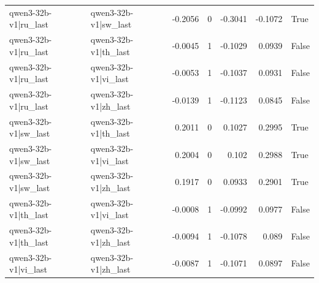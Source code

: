 \begin{table}
\begin{tabular}{l l r r r r l}
qwen3-32b-v1|ru_last & qwen3-32b-v1|sw_last & -0.2056 & 0 & -0.3041 & -0.1072 & True \\
qwen3-32b-v1|ru_last & qwen3-32b-v1|th_last & -0.0045 & 1 & -0.1029 & 0.0939 & False \\
qwen3-32b-v1|ru_last & qwen3-32b-v1|vi_last & -0.0053 & 1 & -0.1037 & 0.0931 & False \\
qwen3-32b-v1|ru_last & qwen3-32b-v1|zh_last & -0.0139 & 1 & -0.1123 & 0.0845 & False \\
qwen3-32b-v1|sw_last & qwen3-32b-v1|th_last & 0.2011 & 0 & 0.1027 & 0.2995 & True \\
qwen3-32b-v1|sw_last & qwen3-32b-v1|vi_last & 0.2004 & 0 & 0.102 & 0.2988 & True \\
qwen3-32b-v1|sw_last & qwen3-32b-v1|zh_last & 0.1917 & 0 & 0.0933 & 0.2901 & True \\
qwen3-32b-v1|th_last & qwen3-32b-v1|vi_last & -0.0008 & 1 & -0.0992 & 0.0977 & False \\
qwen3-32b-v1|th_last & qwen3-32b-v1|zh_last & -0.0094 & 1 & -0.1078 & 0.089 & False \\
qwen3-32b-v1|vi_last & qwen3-32b-v1|zh_last & -0.0087 & 1 & -0.1071 & 0.0897 & False \\
\bottomrule
\end{tabular}
\end{table}
